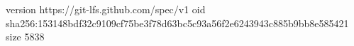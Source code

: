 version https://git-lfs.github.com/spec/v1
oid sha256:153148bdf32c9109cf75be3f78d63bc5c93a56f2e6243943c885b9bb8e585421
size 5838
